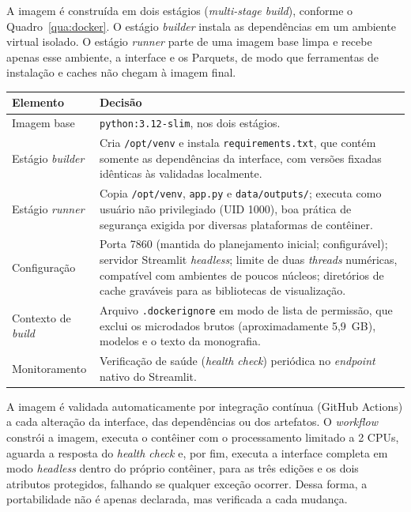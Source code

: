 A imagem é construída em dois estágios (\textit{multi-stage build}), conforme o Quadro~\ref{qua:docker}. O estágio \textit{builder} instala as dependências em um ambiente virtual isolado. O estágio \textit{runner} parte de uma imagem base limpa e recebe apenas esse ambiente, a interface e os Parquets, de modo que ferramentas de instalação e caches não chegam à imagem final.

\begin{quadro}[htbp]
\centering
\caption{Estrutura da imagem Docker da camada online}
\label{qua:docker}
\begin{tabular}{|>{\raggedright\arraybackslash}p{3.2cm}|>{\raggedright\arraybackslash}p{11.3cm}|}
\hline
\textbf{Elemento} & \textbf{Decisão} \\ \hline
Imagem base & \texttt{python:3.12-slim}, nos dois estágios. \\ \hline
Estágio \textit{builder} & Cria \texttt{/opt/venv} e instala \texttt{requirements.txt}, que contém somente as dependências da interface, com versões fixadas idênticas às validadas localmente. \\ \hline
Estágio \textit{runner} & Copia \texttt{/opt/venv}, \texttt{app.py} e \texttt{data/outputs/}; executa como usuário não privilegiado (UID 1000), boa prática de segurança exigida por diversas plataformas de contêiner. \\ \hline
Configuração & Porta 7860 (mantida do planejamento inicial; configurável); servidor Streamlit \textit{headless}; limite de duas \textit{threads} numéricas, compatível com ambientes de poucos núcleos; diretórios de cache graváveis para as bibliotecas de visualização. \\ \hline
Contexto de \textit{build} & Arquivo \texttt{.dockerignore} em modo de lista de permissão, que exclui os microdados brutos (aproximadamente 5,9~GB), modelos e o texto da monografia. \\ \hline
Monitoramento & Verificação de saúde (\textit{health check}) periódica no \textit{endpoint} nativo do Streamlit. \\ \hline
\end{tabular}
\end{quadro}

A imagem é validada automaticamente por integração contínua (GitHub Actions) a cada alteração da interface, das dependências ou dos artefatos. O \textit{workflow} constrói a imagem, executa o contêiner com o processamento limitado a 2 CPUs, aguarda a resposta do \textit{health check} e, por fim, executa a interface completa em modo \textit{headless} dentro do próprio contêiner, para as três edições e os dois atributos protegidos, falhando se qualquer exceção ocorrer. Dessa forma, a portabilidade não é apenas declarada, mas verificada a cada mudança.

